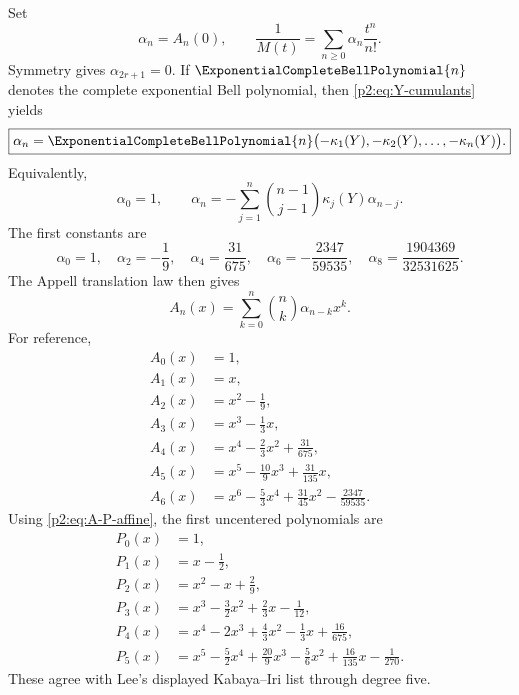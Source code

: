 \documentclass[11pt,oneside]{article}
\numberwithin{equation}{section}
\theoremstyle{definition}
\theoremstyle{remark}
\begin{document}
Set
\begin{equation}
 \alpha_n=A_n(0),
 \qquad
 \frac1{M(t)}=\sum_{n\ge0}\alpha_n\frac{t^n}{n!}.
 \label{p2:eq:alpha-def}
\end{equation}
Symmetry gives $\alpha_{2r+1}=0$.  If $\ExponentialCompleteBellPolynomial{n}$ denotes the complete exponential Bell polynomial,
then \eqref{p2:eq:Y-cumulants} yields
\begin{equation}
 \boxed{
 \alpha_n=\ExponentialCompleteBellPolynomial{n}\bigl(-\kappa_1(Y),-\kappa_2(Y),\ldots,-\kappa_n(Y)\bigr).
 }
 \label{p2:eq:alpha-Bell}
\end{equation}
Equivalently,
\begin{equation}
 \alpha_0=1,
 \qquad
 \alpha_n=-\sum_{j=1}^n\binom{n-1}{j-1}\kappa_j(Y)\alpha_{n-j}.
 \label{p2:eq:alpha-recurrence}
\end{equation}
The first constants are
\begin{equation}
 \alpha_0=1,
 \quad \alpha_2=-\frac19,
 \quad \alpha_4=\frac{31}{675},
 \quad \alpha_6=-\frac{2347}{59535},
 \quad \alpha_8=\frac{1904369}{32531625}.
 \label{p2:eq:alpha-first}
\end{equation}
The Appell translation law then gives
\begin{equation}
 A_n(x)=\sum_{k=0}^n\binom nk\alpha_{n-k}x^k.
 \label{p2:eq:A-from-alpha}
\end{equation}
For reference,
\begin{equation}
\begin{aligned}
 A_0(x)&=1,\\
 A_1(x)&=x,\\
 A_2(x)&=x^2-\frac19,\\
 A_3(x)&=x^3-\frac13x,\\
 A_4(x)&=x^4-\frac23x^2+\frac{31}{675},\\
 A_5(x)&=x^5-\frac{10}{9}x^3+\frac{31}{135}x,\\
 A_6(x)&=x^6-\frac53x^4+\frac{31}{45}x^2-\frac{2347}{59535}.
\end{aligned}
\label{p2:eq:A-first-polys}
\end{equation}
Using \eqref{p2:eq:A-P-affine}, the first uncentered polynomials are
\begin{equation}
\begin{aligned}
 P_0(x)&=1,\\
 P_1(x)&=x-\frac12,\\
 P_2(x)&=x^2-x+\frac29,\\
 P_3(x)&=x^3-\frac32x^2+\frac23x-\frac1{12},\\
 P_4(x)&=x^4-2x^3+\frac43x^2-\frac13x+\frac{16}{675},\\
 P_5(x)&=x^5-\frac52x^4+\frac{20}{9}x^3-\frac56x^2+\frac{16}{135}x-\frac1{270}.
\end{aligned}
\label{p2:eq:P-first-polys}
\end{equation}
These agree with Lee's displayed Kabaya--Iri list through degree five.
\end{document}
